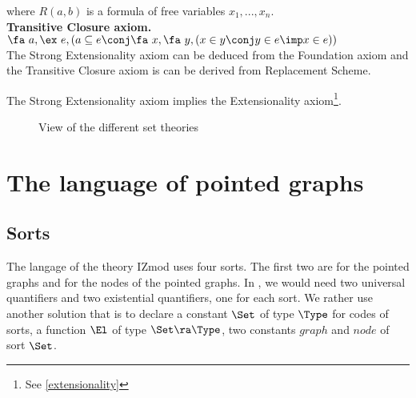 \documentclass[a4paper]{article}
\begin{document}
where $R(a,b)$ is a formula of free variables $x_1, ..., x_n$. \\

\textbf{Transitive Closure axiom.} $\fa~a,\ex~e, (a \subseteq e \conj \fa~x,\fa~y, (x \in y \conj y \in e \imp x \in e))$ \\

The Strong Extensionality axiom can be deduced from the Foundation axiom and the Transitive Closure axiom is can be derived from Replacement Scheme.

The Strong Extensionality axiom implies the Extensionality axiom\footnote{See \ref{extensionality}}.

\begin{figure}[h]
\caption{View of the different set theories}
\end{figure}


\section{The language of pointed graphs}

\subsection{Sorts}

The langage of the theory IZmod uses four sorts. The first two are for
the pointed graphs and for the nodes of the pointed graphs.  In
\dedukti, we would need two universal quantifiers and two
existential quantifiers, one for each sort.  We rather use another
solution \cite{theoryU} that is to declare a constant $\Set$ of type
$\Type$ for codes of sorts, a function $\El$ of type $\Set \ra \Type$,
two constants $graph$ and $node$ of sort $\Set$.
\end{document}

